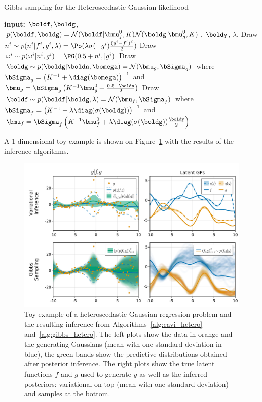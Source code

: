 \begin{algorithm}[H]
    \caption{Gibbs sampling for the Heteroscedastic Gaussian likelihood}
    \begin{algorithmic}
        \State \textbf{input:} $\boldf,\boldg$, $p(\boldf,\boldg) = \mathcal{N}(\boldf|\bmu^0_f, K)\mathcal{N}(\boldg|\bmu^0_g, K)$, $\boldy$, $\lambda$.
            \State Draw $n^i \sim p(n^i|f^i, g^i, \lambda) = \Po(\lambda \sigma(-g^i) \frac{(y^i - f^i)^2}{2})$
            \State Draw $\omega^i \sim p(\omega^i|n^i,g^i) = \PG(0.5 + n^i, |g^i)$
            \State Draw $\boldg \sim p(\boldg|\boldn, \bomega) = \mathcal{N}(\bmu_g,\bSigma_g)$
            \State \quad where $\bSigma_g=  \left(K^{-1} + \diag(\bomega)\right)^{-1}$ and $\bmu_g = \bSigma_g\left(K^{-1}\bmu^0_g + \frac{0.5 - \boldn}{2}\right)$
            \State Draw $\boldf \sim p(\boldf | \boldg, \lambda) = \mathcal{N}(\bmu_f,\bSigma_f)$
            \State \quad where $\bSigma_f = \left(K^{-1} + \lambda\diag(\sigma(\boldg))\right)^{-1}$ and $\bmu_f = \bSigma_f\left(K^{-1}\bmu_f^0 + \lambda\diag(\sigma(\boldg))\frac{\boldy}{2}\right)$
        \EndFor
    \end{algorithmic}
    \label{alg:gibbs_hetero}
\end{algorithm}

A 1-dimensional toy example is shown on Figure~\ref{fig:heteroscedastic} with the results of the inference algorithms.

\begin{figure}
\includegraphics[width=\textwidth]{./chapters/8_discussions/figures/heteroscedastic.pdf}
\caption{Toy example of a heteroscedastic Gaussian regression problem and the resulting inference from Algorithms~\ref{alg:cavi_hetero} and~\ref{alg:gibbs_hetero}.
The left plots show the data in orange and the generating Gaussians (mean with one standard deviation in blue), the green bands show the predictive distributions obtained after posterior inference.
The right plots show the true latent functions $f$ and $g$ used to generate $y$ as well as the inferred posteriors: variational on top (mean with one standard deviation) and samples at the bottom.}
\label{fig:heteroscedastic}
\end{figure}

